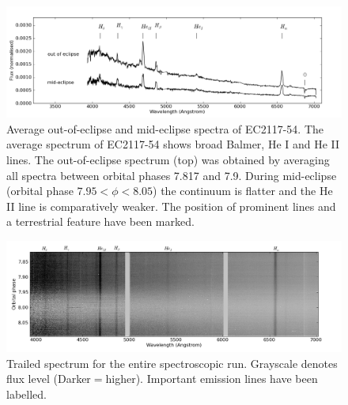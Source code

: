 \begin{figure}
\centering
\begin{narrow}{-1in}{0in}
 \includegraphics[width=1.4\columnwidth,bb=0 0 1200 400]{spectroscopy/spec_properties/in_out_eclipse.png}
 
\end{narrow}
\caption[Average out-of-eclipse and mid-eclipse spectra of EC2117-54]{Average out-of-eclipse and mid-eclipse spectra of EC2117-54. The average spectrum of EC2117-54 shows broad Balmer, He I and He II lines. The out-of-eclipse spectrum (top) was obtained by averaging all spectra between orbital phases 7.817 and 7.9. During mid-eclipse (orbital phase $7.95 < \phi < 8.05$) the continuum is flatter and the He II line is comparatively weaker. The position of prominent lines and a terrestrial feature have been marked.}
\label{average_spec}
\end{figure}


\begin{figure}
\begin{narrow}{-1.2in}{0in}
 \centering
 \includegraphics[width=1.5\columnwidth,bb=0 0 1200 400]{spectroscopy/final/specgram_full.png}
\end{narrow}
 \caption[Trailed spectrum for the entire spectroscopic run.]{Trailed spectrum for the entire spectroscopic run. Grayscale denotes flux level (Darker$=$higher). Important emission lines have been labelled.  }
 \label{specgram_full}
\end{figure}

